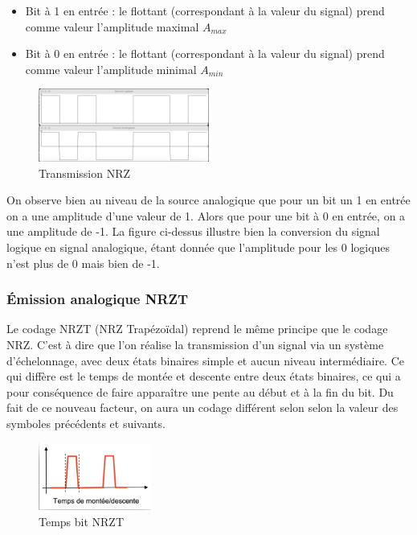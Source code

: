 \begin{itemize}
    \item Bit à 1 en entrée : le flottant (correspondant à la valeur du signal) prend comme valeur l’amplitude maximal $A_{max}$
    \item Bit à 0 en entrée : le flottant (correspondant à la valeur du signal) prend comme valeur l’amplitude minimal $A_{min}$
\end{itemize}

\begin{figure}[H]
    \centering
    \includegraphics[width=0.5\textwidth]{img/etape2_transmission_NRZ.png}
    \caption{Transmission NRZ}
    \label{fig:teb1}
\end{figure}

On observe bien au niveau de la source analogique que pour un bit un 1 en entrée on a une amplitude d’une valeur de 1. Alors que pour une bit à 0 en entrée, on a une amplitude de -1. La figure ci-dessus illustre bien la conversion du signal logique en signal analogique, étant donnée que l’amplitude pour les 0 logiques n’est plus de 0 mais bien de -1.

\subsubsection{Émission analogique NRZT}

Le codage NRZT (NRZ Trapézoïdal) reprend le même principe que le codage NRZ. C’est à dire que l’on réalise la transmission d’un signal via un système d’échelonnage, avec deux états binaires simple et aucun  niveau intermédiaire. Ce qui diffère est le temps de montée et descente entre deux états binaires, ce qui a pour conséquence  de faire apparaître une pente au début et à la fin du bit. Du fait de ce nouveau facteur, on aura un codage différent selon selon la valeur des symboles précédents et suivants.

\begin{figure}[H]
    \centering
    \includegraphics[width=0.33\textwidth]{img/etape2_temps_NRZT.png}
    \caption{Temps bit NRZT}
    \label{fig:teb1}
\end{figure}

